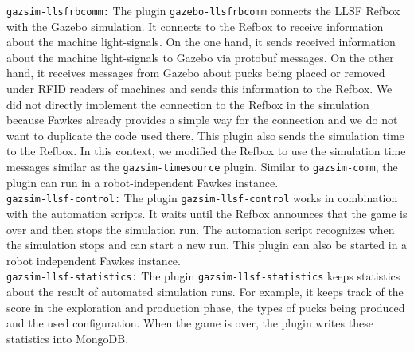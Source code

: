\texttt{gazsim-llsfrbcomm:}
The plugin \texttt{gazebo-llsfrbcomm} connects the LLSF Refbox with the Gazebo simulation. It connects to the Refbox to receive information about the machine light-signals. On the one hand, it sends received information about the machine light-signals to Gazebo via protobuf messages. On the other hand, it receives messages from Gazebo about pucks being placed or removed under RFID readers of machines and sends this information to the Refbox. We did not directly implement the connection to the Refbox in the simulation because Fawkes already provides a simple way for the connection and we do not want to duplicate the code used there. This plugin also sends the simulation time to the Refbox. In this context, we modified the Refbox to use the simulation time messages similar as the \texttt{gazsim-timesource} plugin. Similar to \texttt{gazsim-comm}, the plugin can run in a robot-independent Fawkes instance.
\\

\texttt{gazsim-llsf-control:}
The plugin \texttt{gazsim-llsf-control} works in combination with the automation scripts. It waits until the Refbox announces that the game is over and then stops the simulation run. The automation script recognizes when the simulation stops and can start a new run. This plugin can also be started in a robot independent Fawkes instance.
\\

\texttt{gazsim-llsf-statistics:}
The plugin \texttt{gazsim-llsf-statistics} keeps statistics about the result of automated simulation runs. For example, it keeps track of the score in the exploration and production phase, the types of pucks being produced and the used configuration. When the game is over, the plugin writes these statistics into MongoDB.



